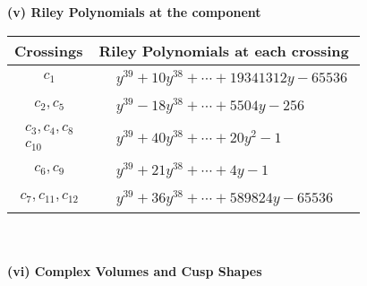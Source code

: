 \documentclass[1p]{elsarticle_modified}
\theoremstyle{definition}
\begin{document}
\newpage\renewcommand{\arraystretch}{1}
\flushleft \textbf{(v) Riley Polynomials at the component}\newline \\
\begin{tabular}{m{50pt}|m{274pt}}
Crossings & \hspace{64pt}Riley Polynomials at each crossing \\
\hline $$\begin{aligned}c_{1}\end{aligned}$$&$\begin{aligned}
&y^{39}+10 y^{38}+\cdots+19341312 y-65536
\end{aligned}$\\
\hline $$\begin{aligned}c_{2},c_{5}\end{aligned}$$&$\begin{aligned}
&y^{39}-18 y^{38}+\cdots+5504 y-256
\end{aligned}$\\
\hline $$\begin{aligned}c_{3},c_{4},c_{8}\\c_{10}\end{aligned}$$&$\begin{aligned}
&y^{39}+40 y^{38}+\cdots+20 y^2-1
\end{aligned}$\\
\hline $$\begin{aligned}c_{6},c_{9}\end{aligned}$$&$\begin{aligned}
&y^{39}+21 y^{38}+\cdots+4 y-1
\end{aligned}$\\
\hline $$\begin{aligned}c_{7},c_{11},c_{12}\end{aligned}$$&$\begin{aligned}
&y^{39}+36 y^{38}+\cdots+589824 y-65536
\end{aligned}$\\
\hline
\end{tabular}\\~\\
\newpage\flushleft \textbf{(vi) Complex Volumes and Cusp Shapes}
\end{document}
